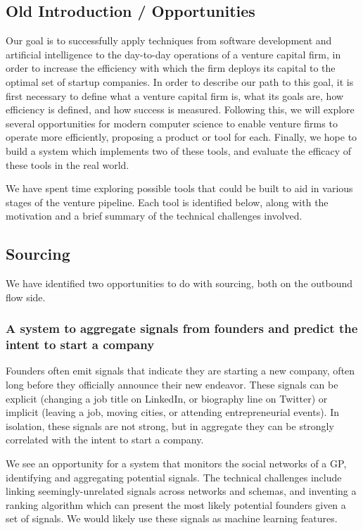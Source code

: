 \subsection{Old Introduction / Opportunities}

Our goal is to successfully apply techniques from software development and artificial intelligence to the day-to-day operations of a venture capital firm, in order to increase the efficiency with which the firm deploys its capital to the optimal set of startup companies. In order to describe our path to this goal, it is first necessary to define what a venture capital firm is, what its goals are, how efficiency is defined, and how success is measured. Following this, we will explore several opportunities for modern computer science to enable venture firms to operate more efficiently, proposing a product or tool for each. Finally, we hope to build a system which implements two of these tools, and evaluate the efficacy of these tools in the real world.

We have spent time exploring possible tools that could be built to aid in various stages of the venture pipeline. Each tool is identified below, along with the motivation and a brief summary of the technical challenges involved.

\subsection{Sourcing}

We have identified two opportunities to do with sourcing, both on the outbound flow side.

\subsubsection{A system to aggregate signals from founders and predict the intent to start a company}

Founders often emit signals that indicate they are starting a new company, often long before they officially announce their new endeavor. These signals can be explicit (changing a job title on LinkedIn, or biography line on Twitter) or implicit (leaving a job, moving cities, or attending entrepreneurial events). In isolation, these signals are not strong, but in aggregate they can be strongly correlated with the intent to start a company.

We see an opportunity for a system that monitors the social networks of a GP, identifying and aggregating potential signals. The technical challenges include linking seemingly-unrelated signals across networks and schemas, and inventing a ranking algorithm which can present the most likely potential founders given a set of signals. We would likely use these signals as machine learning features.

